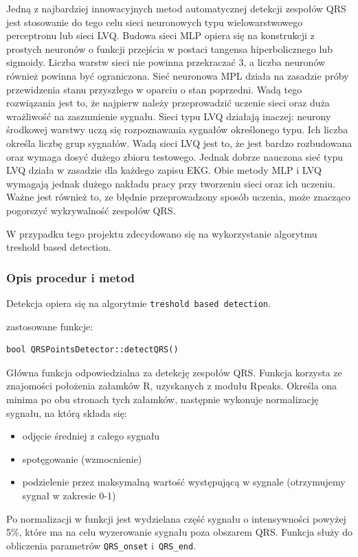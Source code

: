 \documentclass[a4paper, 11pt]{article}
\begin{document}
Jedną z najbardziej innowacyjnych metod automatycznej detekcji zespołów QRS
jest stosowanie do tego celu sieci neuronowych typu wielowarstwowego
perceptronu lub sieci LVQ. Budowa sieci MLP opiera się na konstrukcji z prostych neuronów o funkcji przejścia w postaci
tangensa hiperbolicznego lub sigmoidy. Liczba warstw sieci nie powinna
przekraczać 3, a liczba neuronów również powinna być ograniczona. 
Sieć neuronowa MPL działa na zasadzie próby przewidzenia stanu
przyszłego w oparciu o stan poprzedni. Wadą tego rozwiązania jest to, że najpierw należy przeprowadzić uczenie sieci oraz duża wrażliwość na zaszumienie sygnału.  Sieci typu LVQ działają inaczej: neurony środkowej warstwy uczą się rozpoznawania
sygnałów określonego typu. Ich liczba określa liczbę grup sygnałów.
Wadą sieci LVQ jest to, że jest bardzo rozbudowana oraz
wymaga dosyć dużego zbioru testowego. Jednak dobrze nauczona sieć typu LVQ działa w zasadzie dla każdego zapisu EKG.
Obie metody MLP i LVQ wymagają jednak
dużego nakładu pracy przy tworzeniu sieci oraz ich uczeniu. Ważne jest również to, ze błędnie przeprowadzony sposób uczenia, może znacząco pogorszyć wykrywalność zespołów QRS.

W przypadku tego projektu zdecydowano się na wykorzystanie algorytmu treshold based detection.


\subsubsection{Opis procedur i metod}
\label{sec:waves:procs}
Detekcja opiera się na algorytmie \verb|treshold based detection|.


zastosowane funkcje:


\begin{lstlisting}
bool QRSPointsDetector::detectQRS()
\end{lstlisting}
Główna funkcja odpowiedzialna za detekcję zespołów QRS. Funkcja korzysta ze znajomości położenia
załamków R, uzyskanych z modułu Rpeaks. Określa ona minima po obu stronach tych załamków,
następnie wykonuje normalizację sygnału, na którą składa się:
\begin{itemize}
     \item odjęcie średniej z całego sygnału
     \item spotęgowanie (wzmocnienie)
     \item podzielenie przez maksymalną wartość występującą w sygnale (otrzymujemy sygnał
w zakresie 0-1)
\end{itemize}

Po normalizacji w funkcji jest wydzielana część sygnału o intensywności powyżej 5\%, które ma na
celu wyzerowanie sygnału poza obszarem QRS. Funkcja służy do obliczenia parametrów \verb|QRS_onset| i~\verb|QRS_end|.
\end{document}
